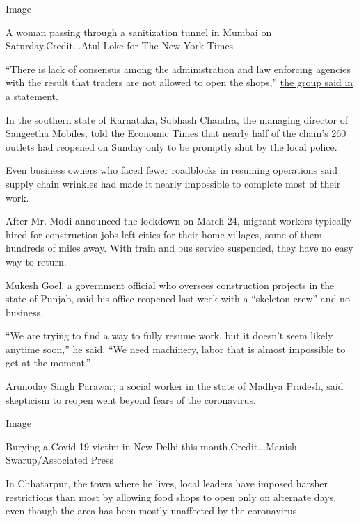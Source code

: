 Image

A woman passing through a sanitization tunnel in Mumbai on
Saturday.Credit...Atul Loke for The New York Times

``There is lack of consensus among the administration and law enforcing
agencies with the result that traders are not allowed to open the
shops,''
\href{https://www.outlookindia.com/newsscroll/cait-awaits-clarity-on-relaxed-lockdown-norms-on-shops/1815243}{the
group said in a statement}.

In the southern state of Karnataka, Subhash Chandra, the managing
director of Sangeetha Mobiles,
\href{https://economictimes.indiatimes.com/industry/services/retail/retail-outlets-stay-shut-despite-mha-relaxation/articleshow/75396154.cms?from=mdr}{told
the Economic Times} that nearly half of the chain's 260 outlets had
reopened on Sunday only to be promptly shut by the local police.

Even business owners who faced fewer roadblocks in resuming operations
said supply chain wrinkles had made it nearly impossible to complete
most of their work.

After Mr. Modi announced the lockdown on March 24, migrant workers
typically hired for construction jobs left cities for their home
villages, some of them hundreds of miles away. With train and bus
service suspended, they have no easy way to return.

Mukesh Goel, a government official who oversees construction projects in
the state of Punjab, said his office reopened last week with a
``skeleton crew'' and no business.

``We are trying to find a way to fully resume work, but it doesn't seem
likely anytime soon,'' he said. ``We need machinery, labor that is
almost impossible to get at the moment.''

Arunoday Singh Parawar, a social worker in the state of Madhya Pradesh,
said skepticism to reopen went beyond fears of the coronavirus.

Image

Burying a Covid-19 victim in New Delhi this month.Credit...Manish
Swarup/Associated Press

In Chhatarpur, the town where he lives, local leaders have imposed
harsher restrictions than most by allowing food shops to open only on
alternate days, even though the area has been mostly unaffected by the
coronavirus.

\href{https://www.nytimes.com/news-event/coronavirus?action=click\&pgtype=Article\&state=default\&region=MAIN_CONTENT_3\&context=storylines_faq}{}

